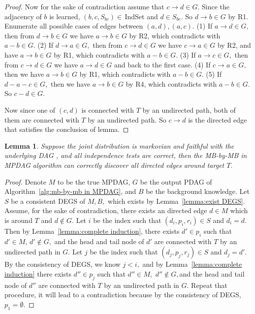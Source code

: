 \documentclass{article}
\newtheorem{lemma}{Lemma}
\begin{document}
\begin{proof}
Now for the sake of contradiction assume that $c\to d\in G.$ Since the adjacency of $b$ is learned, $(b,c,S_{bc})\in\,$IndSet and $d\in S_{bc}.$ So $d\to b\in G$ by R1. Enumerate all possible cases of edges between $(a,d),(a,c).$ (1) If $a\to d\in G,$ then from $d\to b\in G$ we have $a\to b\in G$ by R2, which contradicts with $a-b\in G.$ (2) If $d\to a\in G,$ then from $c\to d\in G$ we have $c\to a\in G$ by R2, and have $a\to b\in G$ by R1, which contradicts with $a-b\in G.$ (3) If $a\to c\in G,$ then from $c\to d\in G$ we have $a\to d\in G$ and back to the first case. (4) If $c\to a\in G,$ then we have $a\to b\in G$ by R1, which contradicts with $a-b\in G.$ (5) If $d-a-c\in G,$ then we have $a\to b\in G$ by R4, which contradicts with $a-b\in G.$ So $c-d\in G.$

Now since one of $(c,d)$ is connected with $T$ by an undirected path, both of them are connected with $T$ by an undirected path. So $c\to d$ is the directed edge that satisfies the conclusion of lemma.
\end{proof}

\begin{lemma}
\label{lemma:complete}
Suppose the joint distribution is markovian and faithful with the underlying DAG , and all independence tests are correct, then the MB-by-MB in MPDAG algorithm can correctly discover all directed edges around target $T.$
\end{lemma}
\begin{proof}
Denote $M$ to be the true MPDAG, $G$ be the output PDAG of Algorithm~\ref{alg:mb-by-mb in MPDAG}, and $B$ be the background knowledge. Let $S$ be a consistent DEGS of $M,B,$ which exists by Lemma~\ref{lemma:exist DEGS}. Assume, for the sake of contradiction, there exists an directed edge $d\in M$ which is around $T$ and $d\not\in G.$ Let $i$ be the index such that $(d_i,p_i,r_i)\in S$ and $d_i=d.$ Then by Lemma~\ref{lemma:complete induction}, there exists $d'\in p_i$ such that $d'\in M$, $d'\not\in G,$ and the head and tail node of $d'$ are connected with $T$ by an undirected path in $G.$ Let $j$ be the index such that $(d_j,p_j,r_j)\in S$ and $d_j=d'.$ By the consistency of DEGS, we know $j<i,$ and by Lemma~\ref{lemma:complete induction} there exists $d''\in p_j$ such that $d''\in M,$ $d''\not\in G,$and the head and tail node of $d''$ are connected with $T$ by an undirected path in $G.$ Repeat that procedure, it will lead to a contradiction because by the consistency of DEGS, $p_1=\emptyset.$
\end{proof}
\end{document}
